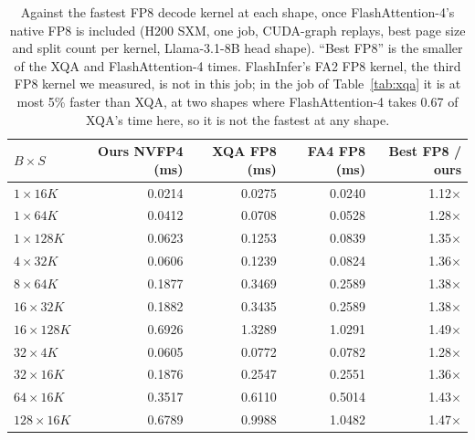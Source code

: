 \documentclass[11pt]{article}
\begin{document}
\begin{table}[tbp]
\centering
\caption{Against the fastest FP8 decode kernel at each shape, once FlashAttention-4's native FP8 is included (H200 SXM, one job, CUDA-graph replays, best page size and split count per kernel, Llama-3.1-8B head shape). ``Best FP8'' is the smaller of the XQA and FlashAttention-4 times. FlashInfer's FA2 FP8 kernel, the third FP8 kernel we measured, is not in this job; in the job of Table~\ref{tab:xqa} it is at most 5\% faster than XQA, at two shapes where FlashAttention-4 takes 0.67 of XQA's time here, so it is not the fastest at any shape.}
\label{tab:fa4}
\small
\begin{tabular}{@{}lrrrr@{}}
\toprule
$B \times S$ & Ours NVFP4 (ms) & XQA FP8 (ms) & FA4 FP8 (ms) & Best FP8 / ours \\
\midrule
$1 \times 16K$ & 0.0214 & 0.0275 & 0.0240 & 1.12$\times$ \\
$1 \times 64K$ & 0.0412 & 0.0708 & 0.0528 & 1.28$\times$ \\
$1 \times 128K$ & 0.0623 & 0.1253 & 0.0839 & 1.35$\times$ \\
$4 \times 32K$ & 0.0606 & 0.1239 & 0.0824 & 1.36$\times$ \\
$8 \times 64K$ & 0.1877 & 0.3469 & 0.2589 & 1.38$\times$ \\
$16 \times 32K$ & 0.1882 & 0.3435 & 0.2589 & 1.38$\times$ \\
$16 \times 128K$ & 0.6926 & 1.3289 & 1.0291 & 1.49$\times$ \\
$32 \times 4K$ & 0.0605 & 0.0772 & 0.0782 & 1.28$\times$ \\
$32 \times 16K$ & 0.1876 & 0.2547 & 0.2551 & 1.36$\times$ \\
$64 \times 16K$ & 0.3517 & 0.6110 & 0.5014 & 1.43$\times$ \\
$128 \times 16K$ & 0.6789 & 0.9988 & 1.0482 & 1.47$\times$ \\
\bottomrule
\end{tabular}
\end{table}
\end{document}
